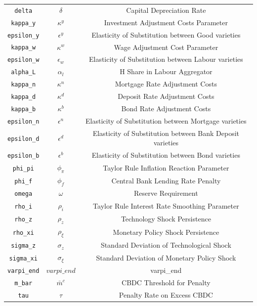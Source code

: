 \begin{center}
\begin{longtable}{ccc}
\texttt{delta} & $\delta$ & Capital Depreciation Rate\\
\texttt{kappa\_y} & $\kappa^y$ & Investment Adjustment Costs Parameter\\
\texttt{epsilon\_y} & $\epsilon^y$ & Elasticity of Substitution between Good varieties\\
\texttt{kappa\_w} & $\kappa^w$ & Wage Adjustment Cost Parameter\\
\texttt{epsilon\_w} & $\epsilon_w$ & Elasticity of Substitution between Labour varieties\\
\texttt{alpha\_L} & $\alpha_l$ & H Share in Labour Aggregator\\
\texttt{kappa\_n} & $\kappa^n$ & Mortgage Rate Adjustment Costs\\
\texttt{kappa\_d} & $\kappa^d$ & Deposit Rate Adjustment Costs\\
\texttt{kappa\_b} & $\kappa^b$ & Bond Rate Adjustment Costs\\
\texttt{epsilon\_n} & $\epsilon^n$ & Elasticity of Substitution between Mortgage varieties\\
\texttt{epsilon\_d} & $\epsilon^d$ & Elasticity of Substitution between Bank Deposit varieties\\
\texttt{epsilon\_b} & $\epsilon^b$ & Elasticity of Substitution between Bond varieties\\
\texttt{phi\_pi} & $\phi_\pi$ & Taylor Rule Inflation Reaction Parameter\\
\texttt{phi\_f} & $\phi_f$ & Central Bank Lending Rate Penalty\\
\texttt{omega} & $\omega$ & Reserve Requirement\\
\texttt{rho\_i} & $\rho_i$ & Taylor Rule Interest Rate Smoothing Parameter\\
\texttt{rho\_z} & $\rho_z$ & Technology Shock Persistence\\
\texttt{rho\_xi} & $\rho_\xi$ & Monetary Policy Shock Persistence\\
\texttt{sigma\_z} & $\sigma_z$ & Standard Deviation of Technological Shock\\
\texttt{sigma\_xi} & $\sigma_\xi$ & Standard Deviation of Monetary Policy Shock\\
\texttt{varpi\_end} & $varpi\_end$ & varpi\_end\\
\texttt{m\_bar} & $\bar{m}^c$ & CBDC Threshold for Penalty\\
\texttt{tau} & $\tau$ & Penalty Rate on Excess CBDC\\
\hline%
\end{longtable}
\end{center}
